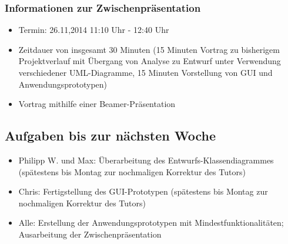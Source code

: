 \documentclass[12pt,a4paper]{article}
\begin{document}
\subsubsection*{Informationen zur Zwischenpräsentation}
\begin{itemize}
\item Termin: 26.11,2014 11:10 Uhr - 12:40 Uhr
\item Zeitdauer von insgesamt 30 Minuten (15 Minuten Vortrag zu bisherigem Projektverlauf mit Übergang von Analyse zu Entwurf unter Verwendung verschiedener UML-Diagramme, 15 Minuten Vorstellung von GUI und Anwendungsprototypen)
\item Vortrag mithilfe einer Beamer-Präsentation
\end{itemize}

\subsection*{Aufgaben bis zur nächsten Woche}
\medskip
\begin{itemize}
\item Philipp W. und Max: Überarbeitung des Entwurfs-Klassendiagrammes (spätestens bis Montag zur nochmaligen Korrektur des Tutors)
\item Chris: Fertigstellung des GUI-Prototypen (spätestens bis Montag zur nochmaligen Korrektur des Tutors)
\item Alle: Erstellung der Anwendungsprototypen mit Mindestfunktionalitäten; Ausarbeitung der Zwischenpräsentation
\end{itemize}
\end{document}
